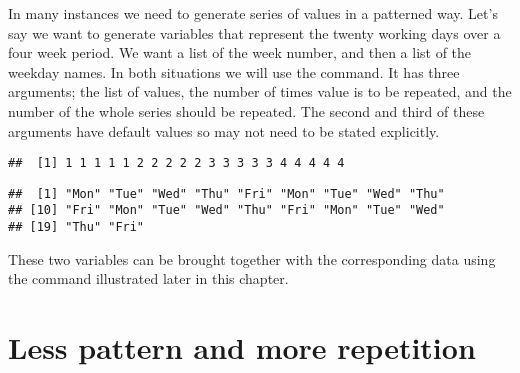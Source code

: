 In many instances we need to generate series of values in a patterned way. Let's say we want to generate variables that represent the twenty working days over a four week period. We want a list of the week number, and then a list of the weekday names. In both situations we will use the  command. It has three arguments; the list of values, the number of times  value is to be repeated, and the number of  the whole series should be repeated.  
The second and third of these arguments have default values so may not need to be stated explicitly. 
\begin{knitrout}
\color{fgcolor}\begin{kframe}
\begin{alltt}
 \hlkwb{=} \hlstd{(}\hlopt{:}\hlstd{,} \hlstd{=}\hlstd{)}
\end{alltt}
\begin{verbatim}
##  [1] 1 1 1 1 1 2 2 2 2 2 3 3 3 3 3 4 4 4 4 4
\end{verbatim}
\begin{alltt}
 \hlkwb{=} \hlstd{(}\hlstd{(}\hlstd{,} \hlstd{,} \hlstd{,} \hlstd{,} \hlstd{),} \hlstd{=}\hlstd{)}
\end{alltt}
\begin{verbatim}
##  [1] "Mon" "Tue" "Wed" "Thu" "Fri" "Mon" "Tue" "Wed" "Thu"
## [10] "Fri" "Mon" "Tue" "Wed" "Thu" "Fri" "Mon" "Tue" "Wed"
## [19] "Thu" "Fri"
\end{verbatim}
\end{kframe}
\end{knitrout}
These two variables can be brought together with the corresponding data using the  command illustrated later in this chapter. 
 
\section{Less pattern and more repetition} 
 
